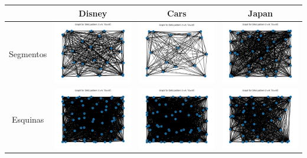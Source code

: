 \begin{table}[H]
	\centering
	\begin{tabular}{|c|c|c|c|}
		\hline
		& Disney & Cars & Japan \\ \hline
		Segmentos & \includegraphics[width=3.5cm]{Graphics/disney-cluster-graph.png} 
		& \includegraphics[width=3.5cm]{Graphics/cars-cluster-graph.png} 
		& \includegraphics[width=3.5cm]{Graphics/japan-cluster-graph.png} \\ \hline
		Esquinas  & \includegraphics[width=3.5cm]{Graphics/disney-corner-graph.png} 
		& \includegraphics[width=3.5cm]{Graphics/cars-corner-graph.png} 
		& \includegraphics[width=3.5cm]{Graphics/japan-corner-graph.png} \\ \hline

\end{tabular}
\end{table}
